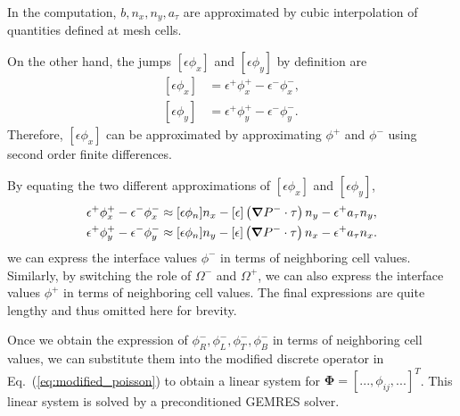 In the computation, $b, n_x, n_y, a_\tau$ are approximated by cubic interpolation of quantities defined at mesh cells.

On the other hand, the jumps $[\epsilon \phi_x]$ and $[\epsilon \phi_y]$ by definition are
\begin{equation}
	\begin{aligned}
		[\epsilon \phi_x] & = \epsilon^+\phi_x^+ - \epsilon^-\phi_x^-, \\
		[\epsilon \phi_y] & = \epsilon^+\phi_y^+ - \epsilon^-\phi_y^-.
	\end{aligned}
\end{equation}
Therefore, $[\epsilon \phi_x]$ can be approximated by approximating $\phi^+$ and $\phi^-$ using second order finite differences.

By equating the two different approximations of $[\epsilon \phi_x]$ and $[\epsilon \phi_y]$,
\begin{equation}
	\begin{aligned}
		\epsilon^+\phi_x^+ - \epsilon^-\phi_x^- & \approx [\epsilon \phi_n] n_x - [\epsilon]\left(\grad{P^-}\cdot\tau\right)n_y - \epsilon^+ a_\tau n_y, \\
		\epsilon^+\phi_y^+ - \epsilon^-\phi_y^- & \approx [\epsilon \phi_n] n_y - [\epsilon]\left(\grad{P^-}\cdot\tau\right)n_x - \epsilon^+ a_\tau n_x.
	\end{aligned}
\end{equation}
we can express the interface values $\phi^-$ in terms of neighboring cell values. Similarly, by switching the role of $\Omega^-$ and $\Omega^+$, we can also express the interface values $\phi^+$ in terms of neighboring cell values. The final expressions are quite lengthy and thus omitted here for brevity.

Once we obtain the expression of $\phi_R^-, \phi_L^-, \phi_T^-, \phi_B^-$ in terms of neighboring cell values, we can substitute them into the modified discrete operator in Eq.~(\ref{eq:modified_poisson}) to obtain a linear system for $\mathbf{\Phi} = [...,\phi_{ij},...]^T$. This linear system is solved by a preconditioned GEMRES solver.

